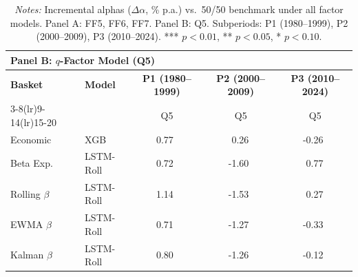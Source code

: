 \begin{table}[H]
{\begin{tabular}{l l *{9}{r l}}
\midrule
\multicolumn{20}{l}{\textbf{Panel B: $q$-Factor Model (Q5)}} \\
\midrule
\textbf{Basket} & \textbf{Model}
& \multicolumn{6}{c}{\textbf{P1 (1980--1999)}}
& \multicolumn{6}{c}{\textbf{P2 (2000--2009)}}
& \multicolumn{6}{c}{\textbf{P3 (2010--2024)}} \\
\cmidrule(lr){3-8}\cmidrule(lr){9-14}\cmidrule(lr){15-20}
& & \multicolumn{2}{c}{} & \multicolumn{2}{c}{Q5} & \multicolumn{2}{c}{}
  & \multicolumn{2}{c}{} & \multicolumn{2}{c}{Q5} & \multicolumn{2}{c}{}
  & \multicolumn{2}{c}{} & \multicolumn{2}{c}{Q5} & \multicolumn{2}{c}{} \\
\midrule
Economic & XGB
& \multicolumn{2}{c}{} & 0.77 &    & \multicolumn{2}{c}{}
& \multicolumn{2}{c}{} & 0.26 &    & \multicolumn{2}{c}{}
& \multicolumn{2}{c}{} & -0.26 &    & \multicolumn{2}{c}{} \\
Beta Exp. & LSTM-Roll
& \multicolumn{2}{c}{} & 0.72 &    & \multicolumn{2}{c}{}
& \multicolumn{2}{c}{} & -1.60 &    & \multicolumn{2}{c}{}
& \multicolumn{2}{c}{} & 0.77 &    & \multicolumn{2}{c}{} \\
Rolling $\beta$ & LSTM-Roll
& \multicolumn{2}{c}{} & 1.14 &    & \multicolumn{2}{c}{}
& \multicolumn{2}{c}{} & -1.53 &    & \multicolumn{2}{c}{}
& \multicolumn{2}{c}{} & 0.27 &    & \multicolumn{2}{c}{} \\
EWMA $\beta$ & LSTM-Roll
& \multicolumn{2}{c}{} & 0.71 &    & \multicolumn{2}{c}{}
& \multicolumn{2}{c}{} & -1.27 &    & \multicolumn{2}{c}{}
& \multicolumn{2}{c}{} & -0.33 &    & \multicolumn{2}{c}{} \\
Kalman $\beta$ & LSTM-Roll
& \multicolumn{2}{c}{} & 0.80 &    & \multicolumn{2}{c}{}
& \multicolumn{2}{c}{} & -1.26 &    & \multicolumn{2}{c}{}
& \multicolumn{2}{c}{} & -0.12 &    & \multicolumn{2}{c}{} \\

\bottomrule
\end{tabular}%
}
\caption*{\footnotesize \textit{Notes:} Incremental alphas ($\Delta\alpha$, \% p.a.) vs.\ 50/50 benchmark under all factor models. Panel A: FF5, FF6, FF7. Panel B: Q5. Subperiods: P1 (1980--1999), P2 (2000--2009), P3 (2010--2024). *** $p<0.01$, ** $p<0.05$, * $p<0.10$.}
\end{table}